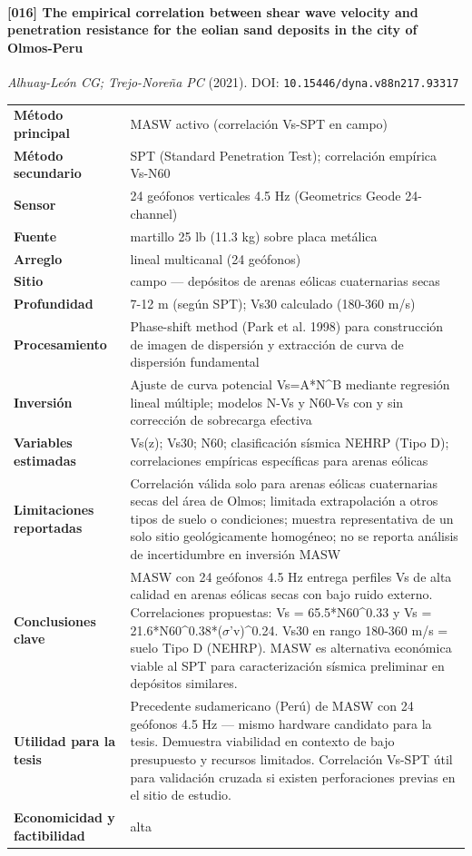 \paragraph{[016] The empirical correlation between shear wave velocity and penetration resistance for the eolian sand deposits in the city of Olmos-Peru} \emph{Alhuay-León CG; Trejo-Noreña PC} (2021).
{\scriptsize DOI: \texttt{10.15446/dyna.v88n217.93317}}

\begin{center}\scriptsize
\begin{tabularx}{\textwidth}{@{}>{\bfseries}p{3.3cm} X@{}}
\toprule
M\'etodo principal & MASW activo (correlación Vs-SPT en campo) \\
M\'etodo secundario & SPT (Standard Penetration Test); correlación empírica Vs-N60 \\
Sensor & 24 geófonos verticales 4.5 Hz (Geometrics Geode 24-channel) \\
Fuente & martillo 25 lb (11.3 kg) sobre placa metálica \\
Arreglo & lineal multicanal (24 geófonos) \\
Sitio & campo --- depósitos de arenas eólicas cuaternarias secas \\
Profundidad & 7-12 m (según SPT); Vs30 calculado (180-360 m/s) \\
Procesamiento & Phase-shift method (Park et al. 1998) para construcción de imagen de dispersión y extracción de curva de dispersión fundamental \\
Inversi\'on & Ajuste de curva potencial Vs=A*N\textasciicircum{}B mediante regresión lineal múltiple; modelos N-Vs y N60-Vs con y sin corrección de sobrecarga efectiva \\
Variables estimadas & Vs(z); Vs30; N60; clasificación sísmica NEHRP (Tipo D); correlaciones empíricas específicas para arenas eólicas \\
Limitaciones reportadas & Correlación válida solo para arenas eólicas cuaternarias secas del área de Olmos; limitada extrapolación a otros tipos de suelo o condiciones; muestra representativa de un solo sitio geológicamente homogéneo; no se reporta análisis de incertidumbre en inversión MASW \\
Conclusiones clave & MASW con 24 geófonos 4.5 Hz entrega perfiles Vs de alta calidad en arenas eólicas secas con bajo ruido externo. Correlaciones propuestas: Vs = 65.5*N60\textasciicircum{}0.33 y Vs = 21.6*N60\textasciicircum{}0.38*($\sigma$'v)\textasciicircum{}0.24. Vs30 en rango 180-360 m/s = suelo Tipo D (NEHRP). MASW es alternativa económica viable al SPT para caracterización sísmica preliminar en depósitos similares. \\
Utilidad para la tesis & Precedente sudamericano (Perú) de MASW con 24 geófonos 4.5 Hz --- mismo hardware candidato para la tesis. Demuestra viabilidad en contexto de bajo presupuesto y recursos limitados. Correlación Vs-SPT útil para validación cruzada si existen perforaciones previas en el sitio de estudio. \\
Economicidad y factibilidad & alta \\
\bottomrule
\end{tabularx}
\end{center}

